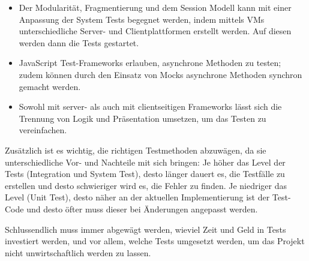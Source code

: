 \documentclass[a4paper,bibtotoc,oneside]{scrbook}
\begin{document}
\begin{itemize}
  \item Der Modularität, Fragmentierung und dem Session Modell kann mit einer Anpassung der System Tests begegnet werden, indem mittels VMs unterschiedliche Server- und Clientplattformen erstellt werden. Auf diesen werden dann die Tests gestartet.
  \item JavaScript Test-Frameworks erlauben, asynchrone Methoden zu testen; zudem können durch den Einsatz von Mocks asynchrone Methoden synchron gemacht werden.
  \item Sowohl mit server- als auch mit clientseitigen Frameworks lässt sich die Trennung von Logik und Präsentation umsetzen, um das Testen zu vereinfachen.
\end{itemize}

Zusätzlich ist es wichtig, die richtigen Testmethoden abzuwägen, da sie unterschiedliche Vor- und Nachteile mit sich bringen: Je höher das Level der Tests (Integration und System Test), desto länger dauert es, die Testfälle zu erstellen und desto schwieriger wird es, die Fehler zu finden. Je niedriger das Level (Unit Test), desto näher an der aktuellen Implementierung ist der Test-Code und desto öfter muss dieser bei Änderungen angepasst werden.

Schlussendlich muss immer abgewägt werden, wieviel Zeit und Geld in Tests investiert werden, und vor allem, welche Tests umgesetzt werden, um das Projekt nicht unwirtschaftlich werden zu lassen.



\end{document}
